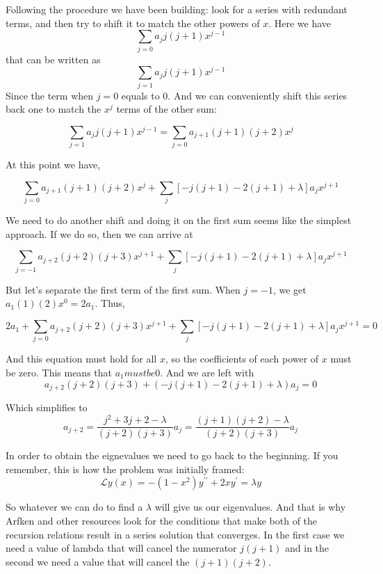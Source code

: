 Following the procedure we have been building: look for a series with redundant terms, and then try to shift it to match
the other powers of $x$.
Here we have
$$
\sum_{j=0} a_j j(j+1) x^{j-1}
$$
that can be written as
$$
\sum_{j=1} a_j j(j+1) x^{j-1}
$$
Since the term when $j=0$ equals to 0.
And we can conveniently shift this series back one to match the $x^j$ terms of the other sum:

$$
\sum_{j=1} a_j j(j+1) x^{j-1}
=
\sum_{j=0} a_{j+1} (j+1)(j+2) x^{j}
$$

At this point we have,

$$
\sum_{j=0} a_{j+1} (j+1)(j+2) x^{j}
    + \sum_j \left[ -j(j+1) -2(j+1) + \lambda \right] a_j x^{j+1}
$$

We need to do another shift and doing it on the first sum seems like the simplest approach.
If we do so, then we can arrive at

$$
\sum_{j=-1} a_{j+2} (j+2)(j+3) x^{j+1}
    + \sum_j \left[ -j(j+1) -2(j+1) + \lambda \right] a_j x^{j+1}
$$

But let's separate the first term of the first sum.
When $j=-1$, we get $a_1 (1)(2) x^0 = 2a_1$.
Thus,

$$
2 a_1 +
    \sum_{j=0} a_{j+2} (j+2)(j+3) x^{j+1}
    + \sum_j \left[ -j(j+1) -2(j+1) + \lambda \right] a_j x^{j+1} = 0
$$

And this equation must hold for all $x$, so the coefficients of each power of $x$ must be zero.
This means that $a_1 must be 0$.
And we are left with
$$
a_{j+2} (j+2)(j+3)
    + \left( -j(j+1) -2(j+1) + \lambda \right) a_j = 0
$$

Which simplifies to
$$
a_{j+2} = \frac{ j^2 + 3j + 2 - \lambda }{ (j+2)(j+3) } a_j
= \frac{ (j+1)(j+2) - \lambda }{ (j+2)(j+3) } a_j
$$

In order to obtain the eignevalues we need to go back to the beginning.
If you remember, this is how the problem was initially framed:
$$
\mathcal{L} y(x) =
-(1-x^2) y^{\prime\prime} + 2x y^\prime = \lambda y
$$

So whatever we can do to find a $\lambda$ will give us our eigenvalues.
And that is why Arfken and other resources look for the conditions that make both of the recursion relations result in
a series solution that converges.
In the first case we need a value of lambda that will cancel the numerator $j(j+1)$ and in the second we need a value that
will cancel the $(j+1)(j+2)$.
